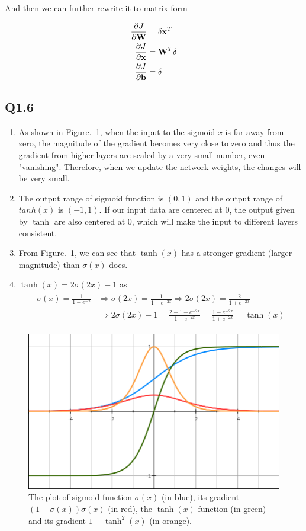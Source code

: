 \documentclass[11pt]{article}
\begin{document}
And then we can further rewrite it to matrix form

\begin{align}
  \frac{\partial J}{\partial\mathbf{W}} &= \mathbf{\delta} \mathbf{x}^T \\
  \frac{\partial J}{\partial\mathbf{x}} &= \mathbf{W}^T \mathbf{\delta} \\
  \frac{\partial J}{\partial\mathbf{b}} &= \mathbf{\delta}
\end{align}

\newpage

\subsection*{Q1.6}

\begin{enumerate}
    \item As shown in Figure.~\ref{fig:q1.6.1}, when the input to the sigmoid $x$ is far away from zero, the magnitude of the gradient becomes very close to zero and thus the gradient from higher layers are scaled by a very small number, even "vanishing". Therefore, when we update the network weights, the changes will be very small.
    \item The output range of sigmoid function is $(0,1)$ and the output range of $tanh(x)$ is $(-1,1)$. If our input data are centered at 0, the output given by $\tanh$ are also centered at 0, which will make the input to different layers consistent.
    \item From Figure.~\ref{fig:q1.6.1}, we can see that $\tanh(x)$ has a stronger gradient (larger magnitude) than $\sigma(x)$ does.
    \item $\tanh(x)=2\sigma(2x)-1$ as
    \begin{align}
    \begin{split}
        \sigma(x) = \frac{1}{1+e^{-x}}
        &\Rightarrow \sigma(2x) = \frac{1}{1+e^{-2x}}
        \Rightarrow 2\sigma(2x) = \frac{2}{1+e^{-2x}} \\
        &\Rightarrow 2\sigma(2x)-1 = \frac{2-1-e^{-2x}}{1+e^{-2x}} = \frac{1-e^{-2x}}{1+e^{-2x}} = \tanh(x)
    \end{split}
    \end{align}
\end{enumerate}

\begin{figure}[h!]
    \centering
    \includegraphics[width=.6\linewidth]{../results/q1_6_1.png}
    \caption{The plot of sigmoid function $\sigma(x)$ (in blue), its gradient $(1-\sigma(x))\sigma(x)$ (in red), the $\tanh(x)$ function (in green) and its gradient $1-\tanh^2(x)$ (in orange). }
    \label{fig:q1.6.1}
\end{figure}
\end{document}

